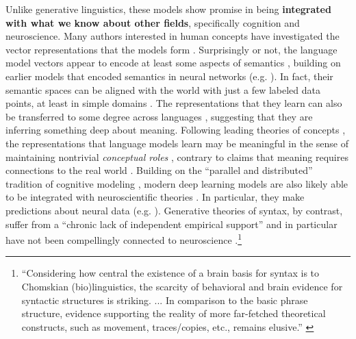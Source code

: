 \documentclass[output=paper,colorlinks,citecolor=brown
]{langscibook}
\begin{document}
Unlike generative linguistics, these models show promise in being \textbf{integrated with what we know about other fields}, specifically cognition and neuroscience. Many authors interested in human  concepts have investigated the vector representations that the models form \citep{lake2021word,bhatia2022transformer}. Surprisingly or not, the language model vectors appear to encode at least some aspects of semantics \citep{maas2011learning,socher2013recursive,bowman2015recursive,grand2022semantic,bhatia2022transformer,bhatia2022transformer,piantadosi2022meaning,dasgupta2022language,petersen2022lexical,pavlick2022semantic}, building on earlier models that encoded semantics in neural networks (e.g. \cite{rogers2004semantic,elman2004alternative,mikolov2013distributed}). In fact, their semantic spaces can be aligned with the world with just a few labeled data points, at least in simple domains \citep{patel2022mapping}. The representations that they learn can also be transferred to some degree across languages \citep{pires2019multilingual,chi2020finding,gonen2020s,papadimitriou2020learning,papadimitriou2021deep,hill2017representational}, suggesting that they are inferring something deep about meaning. Following leading theories of concepts \citep{block1986advertisement,block1998conceptual}, the representations that language models learn may be meaningful in the sense of maintaining nontrivial \emph{conceptual roles} \citep{piantadosi2022meaning}, contrary to claims that meaning requires connections to the real world \citep{bender2020climbing}. Building on the ``parallel and distributed'' tradition of cognitive modeling \citep{mcclelland1986parallel}, modern deep learning models are also likely able to be integrated with neuroscientific theories \citep{marblestone2016toward,richards2019deep,kanwisher2023using,mcclelland2020placing}. In particular, they make predictions about neural data (e.g. \cite{schrimpf2021neural,caucheteux2022deep,goldstein2022shared}). Generative theories of syntax, by contrast, suffer from a ``chronic lack of independent empirical support'' and in particular have not been compellingly connected to neuroscience \citep{edelman2019verbal}.\footnote{``Considering how central the existence of a brain basis for syntax is to Chomskian (bio)linguistics, the scarcity of behavioral and brain evidence for syntactic structures is striking. ... In comparison to the basic phrase structure, evidence supporting the reality of more far-fetched theoretical constructs, such as movement, traces/copies, etc., remains elusive.'' \citep{edelman2019verbal}}
\end{document}
